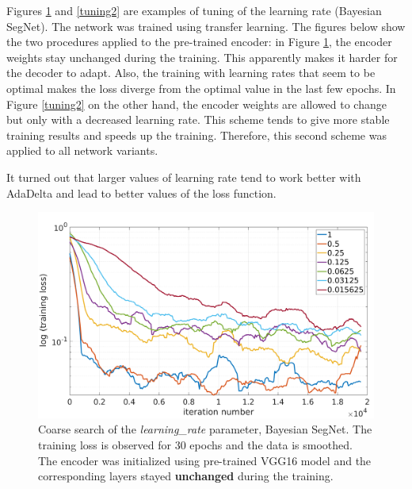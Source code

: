 Figures \ref{tuning1} and \ref{tuning2} are examples of tuning of the learning rate (Bayesian SegNet). The network was trained using transfer learning. The figures below show the two procedures applied to the pre-trained encoder: in Figure \ref{tuning1}, the encoder weights stay unchanged during the training. This apparently makes it harder for the decoder to adapt. Also, the training with learning rates that seem to be optimal makes the loss diverge from the optimal value in the last few epochs. In Figure \ref{tuning2} on the other hand, the encoder weights are allowed to change but only with a decreased learning rate. This scheme tends to give more stable training results and speeds up the training. Therefore, this second scheme was applied to all network variants.  

It turned out that larger values of learning rate tend to work better with AdaDelta and lead to better values of the loss function. 

\newpage

\begin{figure}[h]
	\begin{center}
		\includegraphics*[width=14cm, keepaspectratio]{obr/bayes_full_rough.png}
	\end{center}
	\vspace{5mm}
	\caption{Coarse search of the \textit{learning\_rate} parameter, Bayesian SegNet. The training loss is observed for 30 epochs and the data is smoothed. The encoder was initialized using pre-trained VGG16 model and the corresponding layers stayed \textbf{unchanged} during the training.} 
	\label{tuning1}
\end{figure}

